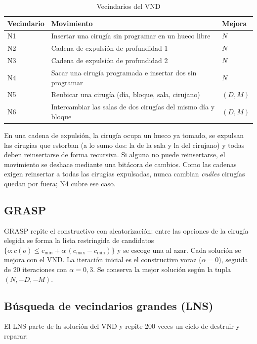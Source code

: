 \begin{table}[t]
	\caption{Vecindarios del VND}
	\label{tab:vecindarios}
	\centering
	\small
	\begin{tabular}{@{}l p{4.6cm} l@{}}
		\hline
		Vecindario & Movimiento & Mejora \\
		\hline
		N1 & Insertar una cirugía sin programar en un hueco libre & $N$ \\
		N2 & Cadena de expulsión de profundidad 1 & $N$ \\
		N3 & Cadena de expulsión de profundidad 2 & $N$ \\
		N4 & Sacar una cirugía programada e insertar dos sin programar & $N$ \\
		N5 & Reubicar una cirugía (día, bloque, sala, cirujano) & $(D,M)$ \\
		N6 & Intercambiar las salas de dos cirugías del mismo día y bloque & $(D,M)$ \\
		\hline
	\end{tabular}
\end{table}

En una cadena de expulsión, la cirugía ocupa un hueco ya tomado, se expulsan las cirugías que estorban (a lo sumo dos: la de la sala y la del cirujano) y todas deben reinsertarse de forma recursiva. Si alguna no puede reinsertarse, el movimiento se deshace mediante una bitácora de cambios. Como las cadenas exigen reinsertar a todas las cirugías expulsadas, nunca cambian \emph{cuáles} cirugías quedan por fuera; N4 cubre ese caso.

\subsection{GRASP}

GRASP repite el constructivo con aleatorización: entre las opciones de la cirugía elegida se forma la lista restringida de candidatos $\{o : c(o)\le c_{\min}+\alpha\,(c_{\max}-c_{\min})\}$ y se escoge una al azar. Cada solución se mejora con el VND. La iteración inicial es el constructivo voraz ($\alpha=0$), seguida de 20 iteraciones con $\alpha=0{,}3$. Se conserva la mejor solución según la tupla $(N,-D,-M)$.

\subsection{Búsqueda de vecindarios grandes (LNS)}

El LNS parte de la solución del VND y repite 200 veces un ciclo de destruir y reparar:

